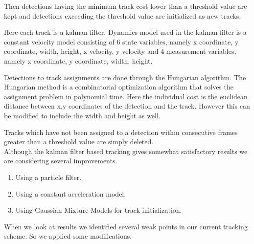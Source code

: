\documentclass[12pt,a4paper]{report}
\begin{document}
Then detections having the minimum track cost lower than a threshold value are kept and detections exceeding the threshold value are initialized as new tracks. 
\par Here each track is a kalman filter. Dynamics model used in the kalman filter is a constant velocity model consisting of 6 state variables, namely { x coordinate, y coordinate, width, height, x velocity, y velocity} and 4 measurement variables, namely  { x coordinate, y coordinate, width, height}.
\par Detections to track assignments are done through the Hungarian algorithm. The Hungarian method is a combinatorial optimization algorithm that solves the assignment problem in polynomial time. Here the individual cost is the euclidean distance between x,y coordinates of the detection and the track. However this can be modified to include the width and height as well.
\par Tracks which have not been assigned to a detection within consecutive frames greater than a threshold value are simply deleted. \\
\noindent Although the kalman filter based tracking gives somewhat satisfactory results we are considering several improvements.
\begin{enumerate}
\item Using a particle filter.
\item Using a constant acceleration model.
\item Using Gaussian Mixture Models for track initialization.
\end{enumerate}
When we look at results we identified several weak points in our current tracking scheme. So we applied some modifications.
\end{document}

